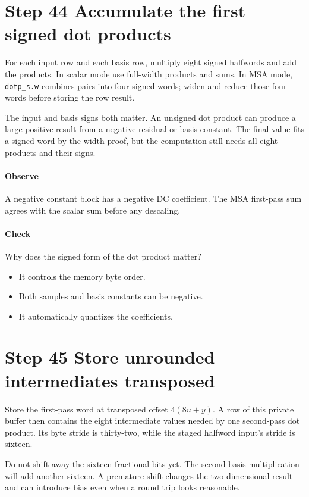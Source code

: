 \section{Step 44 Accumulate the first signed dot products}\label{h263-transform-s04}
For each input row and each basis row, multiply eight signed halfwords and add
the products. In scalar mode use full-width products and sums. In MSA mode,
\texttt{dotp\_s.w} combines pairs into four signed words; widen and reduce those
four words before storing the row result.

The input and basis signs both matter. An unsigned dot product can produce a
large positive result from a negative residual or basis constant. The final
value fits a signed word by the width proof, but the computation still needs
all eight products and their signs.

\paragraph{Observe} A negative constant block has a negative DC coefficient.
The MSA first-pass sum agrees with the scalar sum before any descaling.
\paragraph{Check} Why does the signed form of the dot product matter?
\begin{itemize}
  \item[A.] It controls the memory byte order.
  \item[B.] Both samples and basis constants can be negative.
  \item[C.] It automatically quantizes the coefficients.
\end{itemize}

\section{Step 45 Store unrounded intermediates transposed}\label{h263-transform-s05}
Store the first-pass word at transposed offset $4(8u+y)$. A row of this private
buffer then contains the eight intermediate values needed by one second-pass
dot product. Its byte stride is thirty-two, while the staged halfword input's
stride is sixteen.

Do not shift away the sixteen fractional bits yet. The second basis multiplication
will add another sixteen. A premature shift changes the two-dimensional result
and can introduce bias even when a round trip looks reasonable.

